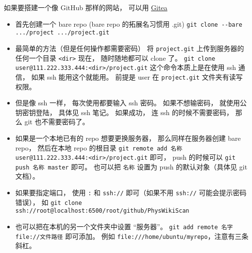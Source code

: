 
\begin{issues}
\issueDraft
\end{issues}


如果要搭建一个像 GitHub 那样的网站， 可以用 \href{https://github.com/go-gitea/gitea}{Gitea}

\begin{itemize}
\item 首先创建一个 bare repo (bare repo 的拓展名习惯用 .git)
\verb|git clone --bare .../project .../project.git|

\item 最简单的方法（但是任何操作都需要密码）
将 \verb|project.git| 上传到服务器的任何一个目录 \verb|<dir>|
现在， 随时随地都可以 clone 了。
\verb`git clone user@111.222.333.444:<dir>/project.git`
这个命令本质上是在使用 ssh 通信， 如果 ssh 能用这个就能用。
前提是 user 在 \verb|project.git| 文件夹有读写权限。

\item 但是像 ssh 一样， 每次使用都要输入 ssh 密码。 如果不想输密码， 就使用公钥密钥登陆， 具体见 ssh 笔记。 如果成功， 连 ssh 的时候不需要密码， 那么 git 也不需要密码了。

\item 如果是一个本地已有的 repo 想要更换服务器， 那么同样在服务器创建 bare repo， 然后在本地 repo 的根目录 \verb`git remote add 名称 user@111.222.333.444:<dir>/project.git` 即可， push 的时候可以 \verb`git push 名称 master` 即可。 也可以把 \verb`名称` 设置为 push 的默认对象（具体见 git 文档）。

\item 如果要指定端口， 使用 \verb`:` 和 \verb`ssh://` 即可（如果不用 \verb`ssh://` 可能会提示密码错误）， 如 \verb`git clone ssh://root@localhost:6500/root/github/PhysWikiScan`

\item 也可以把在本机的另一个文件夹中设置 “服务器”。 \verb|git add remote 名字 file://文件路径| 即可添加。 例如 \verb|file:///home/ubuntu/myrepo|，注意有三条斜杠。
\end{itemize}

